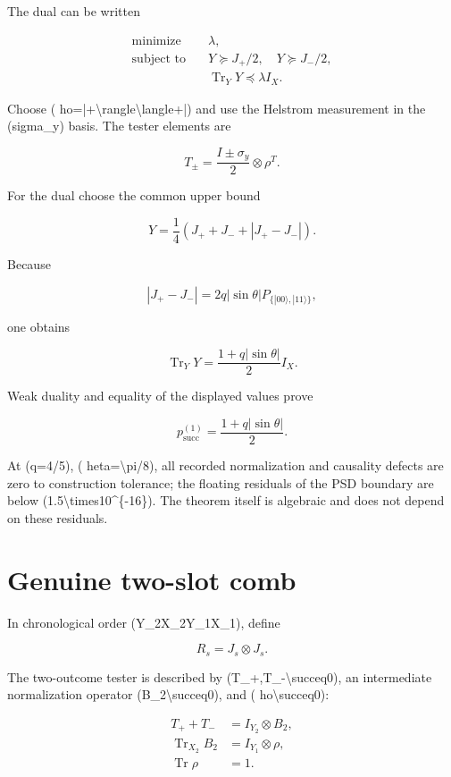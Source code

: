\documentclass[11pt,a4paper,openany]{report}
\begin{document}
The dual can be written

\[
\begin{aligned}
\text{minimize}\quad &\lambda,\\
\text{subject to}\quad &Y\succeq J_+/2,\quad Y\succeq J_-/2,\\
&\operatorname{Tr}_Y Y\preceq\lambda I_X.
\end{aligned}
\]

Choose ( ho=|+\textbackslash{}rangle\textbackslash{}langle+|) and use the Helstrom measurement in the (sigma\_y) basis. The tester elements are

\[
T_\pm=\frac{I\pm\sigma_y}{2}\otimes\rho^T.
\]

For the dual choose the common upper bound

\[
Y=\frac14\left(J_++J_-+|J_+-J_-|\right).
\]

Because

\[
|J_+-J_-|
=2q|\sin\theta|P_{\{|00\rangle,|11\rangle\}},
\]

one obtains

\[
\operatorname{Tr}_Y Y
=\frac{1+q|\sin\theta|}{2}I_X.
\]

Weak duality and equality of the displayed values prove

\[
p_{\mathrm{succ}}^{(1)}
=\frac{1+q|\sin\theta|}{2}.
\]

At (q=4/\allowbreak{}5), (	heta=\textbackslash{}pi/\allowbreak{}8), all recorded normalization and causality defects are zero to construction tolerance; the floating residuals of the PSD boundary are below (1.5\textbackslash{}times10\textasciicircum{}\{-16\}). The theorem itself is algebraic and does not depend on these residuals.

\section{Genuine two-slot comb}

In chronological order (Y\_2X\_2Y\_1X\_1), define

\[
R_s=J_s\otimes J_s.
\]

The two-outcome tester is described by (T\_+,T\_-\textbackslash{}succeq0), an intermediate normalization operator (B\_2\textbackslash{}succeq0), and ( ho\textbackslash{}succeq0):

\[
\begin{aligned}
T_++T_-&=I_{Y_2}\otimes B_2,\\
\operatorname{Tr}_{X_2}B_2&=I_{Y_1}\otimes\rho,\\
\operatorname{Tr}\rho&=1.
\end{aligned}
\]
\end{document}
